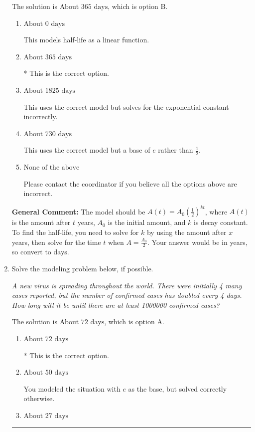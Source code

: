\documentclass{extbook}[14pt]
\newcommand{\litem}[1]{\item #1

\rule{\textwidth}{0.4pt}}
\begin{document}
\begin{enumerate}
{The solution is \( \text{About } 365 \text{ days} \), which is option B.\begin{enumerate}[label=\Alph*.]
\item \( \text{About } 0 \text{ days} \)

This models half-life as a linear function.
\item \( \text{About } 365 \text{ days} \)

* This is the correct option.
\item \( \text{About } 1825 \text{ days} \)

This uses the correct model but solves for the exponential constant incorrectly.
\item \( \text{About } 730 \text{ days} \)

This uses the correct model but a base of $e$ rather than $\frac{1}{2}$.
\item \( \text{None of the above} \)

Please contact the coordinator if you believe all the options above are incorrect.
\end{enumerate}

\textbf{General Comment:} The model should be $A(t) = A_0 (\frac{1}{2})^{kt}$, where $A(t)$ is the amount after $t$ years, $A_0$ is the initial amount, and $k$ is decay constant. To find the half-life, you need to solve for $k$ by using the amount after $x$ years, then solve for the time $t$ when $A = \frac{A_0}{2}$. Your answer would be in years, so convert to days.
}
\litem{
Solve the modeling problem below, if possible.

\begin{center}
    \textit{ A new virus is spreading throughout the world. There were initially 4 many cases reported, but the number of confirmed cases has doubled every 4 days. How long will it be until there are at least 1000000 confirmed cases? }
\end{center}


The solution is \( \text{About } 72 \text{ days} \), which is option A.\begin{enumerate}[label=\Alph*.]
\item \( \text{About } 72 \text{ days} \)

* This is the correct option.
\item \( \text{About } 50 \text{ days} \)

You modeled the situation with $e$ as the base, but solved correctly otherwise.
\item \( \text{About } 27 \text{ days} \)


\end{enumerate}}
\end{enumerate}
\end{document}
